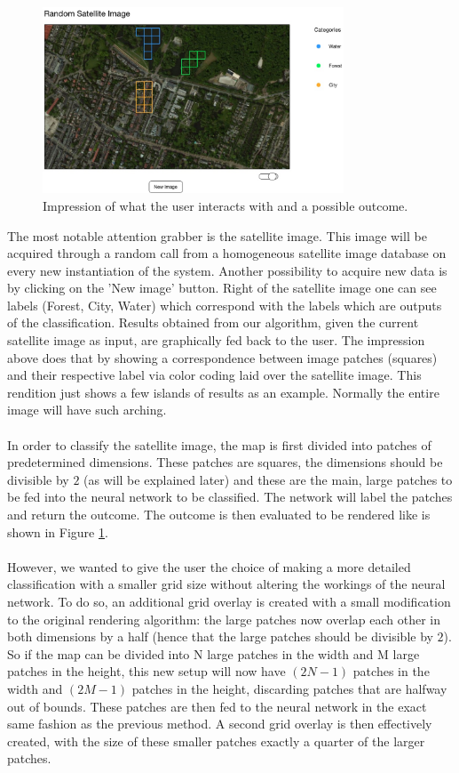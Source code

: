 \documentclass[a4paper,onecolumn]{report}
\begin{document}
\begin{figure}[h!]
    \centering
    \includegraphics[width=0.8\textwidth]{./images/impression_toggle.jpg}
    \caption{Impression of what the user interacts with and a possible outcome.}
	\label{fig:impression}
\end{figure}
\noindent
The most notable attention grabber is the satellite image. This image will be acquired through a random call from a homogeneous satellite image database on every new instantiation of the system. Another possibility to acquire new data is by clicking on the 'New image' button. Right of the satellite image one can see labels (Forest, City, Water) which correspond with the labels which are outputs of the classification. Results obtained from our algorithm, given the current satellite image as input, are graphically fed back to the user. The impression above does that by showing a correspondence between image patches (squares) and their respective label via color coding laid over the satellite image. This rendition just shows a few islands of results as an example. Normally the entire image will have such arching.\\
\\
In order to classify the satellite image, the map is first divided into patches of predetermined dimensions. These patches are squares, the dimensions should be divisible by $2$ (as will be explained later) and these are the main, large patches to be fed into the neural network to be classified. The network will label the patches and return the outcome. The outcome is then evaluated to be rendered like is shown in Figure \ref{fig:impression}.\\
\\
However, we wanted to give the user the choice of making a more detailed classification with a smaller grid size without altering the workings of the neural network. To do so, an additional grid overlay is created with a small modification to the original rendering algorithm: the large patches now overlap each other in both dimensions by a half (hence that the large patches should be divisible by $2$). So if the map can be divided into N large patches in the width and M large patches in the height, this new setup will now have $(2N - 1)$ patches in the width and $(2M - 1)$ patches in the height, discarding patches that are halfway out of bounds. These patches are then fed to the neural network in the exact same fashion as the previous method. A second grid overlay is then effectively created, with the size of these smaller patches exactly a quarter of the larger patches. 
\end{document}
